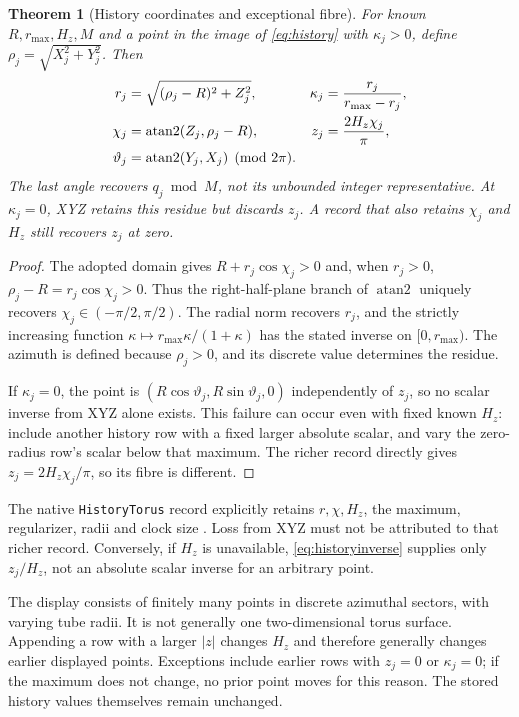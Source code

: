 \documentclass[11pt,a4paper]{article}
\newtheorem{theorem}{Theorem}[section]
\theoremstyle{definition}
\theoremstyle{remark}
\newcommand{\atan}{\operatorname{atan2}}
\begin{document}
\begin{theorem}[History coordinates and exceptional fibre]
\label{thm:history}
For known $R,r_{\max},H_z,M$ and a point in the image of
\eqref{eq:history} with $\kappa_j>0$, define
$\rho_j=\sqrt{X_j^2+Y_j^2}$. Then
\begin{align}
 r_j&=\sqrt{(\rho_j-R)^2+Z_j^2},&
 \kappa_j&=\frac{r_j}{r_{\max}-r_j},\notag\\
 \chi_j&=\atan(Z_j,\rho_j-R),&
 z_j&=\frac{2H_z\chi_j}{\pi}, \label{eq:historyinverse}\\
 \vartheta_j&=\atan(Y_j,X_j)\pmod{2\pi}.&&\notag
\end{align}
The last angle recovers $q_j\bmod M$, not its unbounded integer
representative. At $\kappa_j=0$, XYZ retains this residue but
discards $z_j$. A record that also retains $\chi_j$ and $H_z$
still recovers $z_j$ at zero.
\end{theorem}
\begin{proof}
The adopted domain gives $R+r_j\cos\chi_j>0$ and, when
$r_j>0$, $\rho_j-R=r_j\cos\chi_j>0$. Thus the right-half-plane
branch of $\atan$ uniquely recovers $\chi_j\in(-\pi/2,\pi/2)$.
The radial norm recovers $r_j$, and the strictly increasing
function $\kappa\mapsto r_{\max}\kappa/(1+\kappa)$ has the
stated inverse on $[0,r_{\max})$. The azimuth is defined
because $\rho_j>0$, and its discrete value determines the
residue.

If $\kappa_j=0$, the point is
$(R\cos\vartheta_j,R\sin\vartheta_j,0)$ independently of
$z_j$, so no scalar inverse from XYZ alone exists.
This failure can occur even with fixed known $H_z$: include
another history row with a fixed larger absolute scalar,
and vary the zero-radius row's scalar below that maximum.
The richer record directly gives
$z_j=2H_z\chi_j/\pi$, so its fibre is different.
\end{proof}

The native \texttt{HistoryTorus} record explicitly retains
$r,\chi,H_z$, the maximum, regularizer, radii and clock size
\cite{diagnostics}. Loss from XYZ must not be attributed to
that richer record. Conversely, if $H_z$ is unavailable,
\eqref{eq:historyinverse} supplies only $z_j/H_z$, not an
absolute scalar inverse for an arbitrary point.

The display consists of finitely many points in discrete
azimuthal sectors, with varying tube radii. It is not generally
one two-dimensional torus surface. Appending a row with a
larger $|z|$ changes $H_z$ and therefore generally changes
earlier displayed points. Exceptions include earlier rows
with $z_j=0$ or $\kappa_j=0$; if the maximum does not change,
no prior point moves for this reason. The stored history values
themselves remain unchanged.
\end{document}
